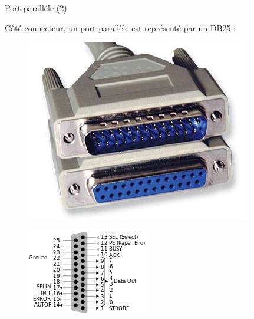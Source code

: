 \documentclass[12pt, t]{beamer}
\begin{document}
\begin{frame}{Port parallèle (2)}

    \vspace{15pt}
    Côté connecteur, un port parallèle est représenté par un DB25 :

    \begin{figure}
        \centering
        \includegraphics[scale=0.25]{db25.jpeg}
    \end{figure}

    {
        \begin{figure}
            \centering
            \includegraphics[scale=0.7]{db25-pinout.png}
        \end{figure}
    }

\end{frame}
\end{document}
